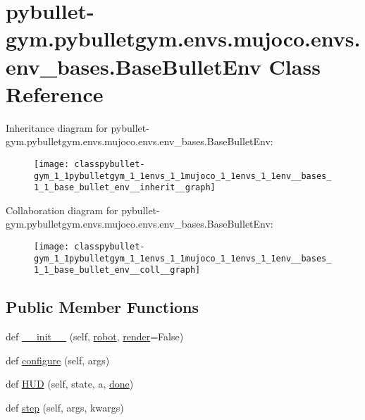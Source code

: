 \hypertarget{classpybullet-gym_1_1pybulletgym_1_1envs_1_1mujoco_1_1envs_1_1env__bases_1_1_base_bullet_env}{}\section{pybullet-\/gym.pybulletgym.\+envs.\+mujoco.\+envs.\+env\+\_\+bases.\+Base\+Bullet\+Env Class Reference}
\label{classpybullet-gym_1_1pybulletgym_1_1envs_1_1mujoco_1_1envs_1_1env__bases_1_1_base_bullet_env}


Inheritance diagram for pybullet-\/gym.pybulletgym.\+envs.\+mujoco.\+envs.\+env\+\_\+bases.\+Base\+Bullet\+Env\+:
\nopagebreak
\begin{figure}[H]
\begin{center}
\leavevmode
\texttt{[image: classpybullet-gym\_1\_1pybulletgym\_1\_1envs\_1\_1mujoco\_1\_1envs\_1\_1env\_\_bases\_1\_1\_base\_bullet\_env\_\_inherit\_\_graph]}
\end{center}
\end{figure}


Collaboration diagram for pybullet-\/gym.pybulletgym.\+envs.\+mujoco.\+envs.\+env\+\_\+bases.\+Base\+Bullet\+Env\+:
\nopagebreak
\begin{figure}[H]
\begin{center}
\leavevmode
\texttt{[image: classpybullet-gym\_1\_1pybulletgym\_1\_1envs\_1\_1mujoco\_1\_1envs\_1\_1env\_\_bases\_1\_1\_base\_bullet\_env\_\_coll\_\_graph]}
\end{center}
\end{figure}
\subsection*{Public Member Functions}
\begin{DoxyCompactItemize}
\item 
def \hyperlink{classpybullet-gym_1_1pybulletgym_1_1envs_1_1mujoco_1_1envs_1_1env__bases_1_1_base_bullet_env_af1596cf8d2c69078ef8537ca98e35809}{\+\_\+\+\_\+init\+\_\+\+\_\+} (self, \hyperlink{classpybullet-gym_1_1pybulletgym_1_1envs_1_1mujoco_1_1envs_1_1env__bases_1_1_base_bullet_env_a3d69bd15ce3e96be0b75c2500cf49775}{robot}, \hyperlink{classpybullet-gym_1_1pybulletgym_1_1envs_1_1mujoco_1_1envs_1_1env__bases_1_1_base_bullet_env_a0f2431bf012811bd8d2d51d774bf70cb}{render}=False)
\item 
def \hyperlink{classpybullet-gym_1_1pybulletgym_1_1envs_1_1mujoco_1_1envs_1_1env__bases_1_1_base_bullet_env_a801fc8a7c39a7cd350c153b5dbea54bf}{configure} (self, args)
\item 
def \hyperlink{classpybullet-gym_1_1pybulletgym_1_1envs_1_1mujoco_1_1envs_1_1env__bases_1_1_base_bullet_env_adb9b0e8326efe5d1d4466be34d82059a}{H\+UD} (self, state, a, \hyperlink{classpybullet-gym_1_1pybulletgym_1_1envs_1_1mujoco_1_1envs_1_1env__bases_1_1_base_bullet_env_a9f1502cc9c3e7635073f5618be748191}{done})
\item 
def \hyperlink{classpybullet-gym_1_1pybulletgym_1_1envs_1_1mujoco_1_1envs_1_1env__bases_1_1_base_bullet_env_a264391f00c4ad8c27f1f9f9f6585b9ce}{step} (self, args, kwargs)
\end{DoxyCompactItemize}
